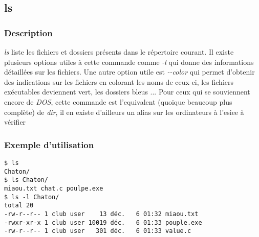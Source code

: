 \subsection*{ls}
\subsubsection*{Description}
\emph{ls} liste les fichiers et dossiers présents dans le répertoire courant.
Il existe plusieurs options utiles à cette commande comme \emph{-l} qui donne des informations détaillées sur les fichiers.
Une autre option utile est \emph{-{}-color} qui permet d'obtenir des indications sur les fichiers en colorant les noms de ceux-ci, les fichiers exécutables deviennent vert, les dossiers bleus ...
Pour ceux qui se souviennent encore de \emph{DOS}, cette commande est l'equivalent (quoique beaucoup plus complète) de \emph{dir}, il en existe d'ailleurs un alias sur les ordinateurs à l'esiee \textcolor{grey2}{à vérifier}

\subsubsection*{Exemple d'utilisation}
\begin{lstlisting}
$ ls
Chaton/
$ ls Chaton/
miaou.txt chat.c poulpe.exe
$ ls -l Chaton/
total 20
-rw-r--r-- 1 club user    13 déc.   6 01:32 miaou.txt
-rwxr-xr-x 1 club user 10019 déc.   6 01:33 pouple.exe
-rw-r--r-- 1 club user   301 déc.   6 01:33 value.c
\end{lstlisting}
